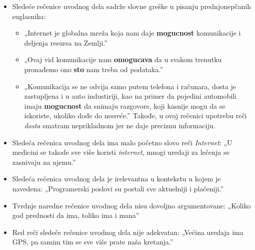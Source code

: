 \documentclass[a4paper]{report}
\begin{document}
\begin{itemize}
    \item Sledeće rečenice uvodnog dela sadrže slovne greške u pisanju prednjonepčanih suglasnika:
    \begin{itemize}
    \item„Internet je globalna mreža koja nam daje \textbf{mogucnost} komunikacije i deljenja resursa na Zemlji.”
    \end{itemize}
    \begin{itemize}
    \item „Ovaj vid komunikacije nam \textbf{omogucava} da u svakom trenutku pronađemo ono  \textbf{sto} nam treba od podataka.”
    \end{itemize}
     \begin{itemize}
    \item „Komunikacija se ne odvija samo putem telefona i računara, dosta je zastupljena i u auto industiriji, kao na primer da pojedini automobili imaju \textbf{mogucnost} da snimaju razgovore, koji kasnije mogu da se iskoriste, ukoliko dođe do nesreće.”\newline
    Takođe, u ovoj rečenici upotrebu reči \textit{dosta} smatram neprikladnom jer ne daje preciznu informaciju. 
    \end{itemize}
\end{itemize}
\begin{itemize}
    \item Sledeća rečenica uvodnog dela ima malo početno slovo reči \textit{Internet}:\newline
       „U medicini se takode sve više koristi \textit{internet}, mnogi uredaji za lečenja se zasnivaju na njemu.”
\end{itemize}
\begin{itemize}
    \item Sledeća rečenica uvodnog dela je irelevantna u kontekstu u kojem je navedena:\newline
    „Programerski poslovi su postali sve aktuelniji i plaćeniji.”
\end{itemize}
\begin{itemize}
    \item Tvrdnje naredne rečenice uvodnog dela nisu dovoljno argumentovane:\newline
    „Koliko god prednosti da ima, toliko ima i mana”
\end{itemize}
\begin{itemize}
    \item Red reči sledeče rečenice uvodnog dela nije adekvatan:\newline
    „Većina uredaja ima GPS, pa samim tim se sve više prate naša kretanja.”
\end{itemize}
\end{document}
